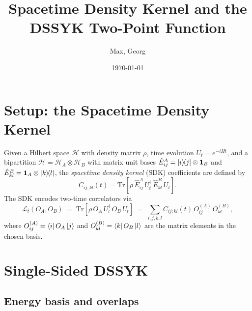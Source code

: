 \documentclass[12pt]{scrarticle}
\title{Spacetime Density Kernel and the DSSYK Two-Point Function}
\author{Max, Georg}
\date{\today}
\begin{document}
\maketitle

\section{Setup: the Spacetime Density Kernel}

Given a Hilbert space $\mathcal{H}$ with density matrix $\rho$, time evolution $U_t = e^{-iHt}$,
and a bipartition $\mathcal{H} = \mathcal{H}_A \otimes \mathcal{H}_B$ with matrix unit bases
$\hat{E}^A_{ij} = \ketbra{i}{j} \otimes \mathbf{1}_B$ and
$\hat{E}^B_{kl} = \mathbf{1}_A \otimes \ketbra{k}{l}$,
the \emph{spacetime density kernel} (SDK) coefficients are defined by
\begin{equation}
    C_{ij;kl}(t) = \text{Tr}\!\left[\rho\,\hat{E}^A_{ij}\,U_t^\dagger\,\hat{E}^B_{kl}\,U_t\right].
    \label{eq:SDK_def}
\end{equation}
The SDK encodes two-time correlators via
\begin{equation}
    \mathcal{L}_t(O_A, O_B)
    \;=\; \text{Tr}\!\left[\rho\,O_A\,U_t^\dagger\,O_B\,U_t\right]
    \;=\; \sum_{i,j,k,l} C_{ij;kl}(t)\,O^{(A)}_{ij}\,O^{(B)}_{kl},
    \label{eq:correlator_from_SDK}
\end{equation}
where $O^{(A)}_{ij} = \bra{i}O_A\ket{j}$ and $O^{(B)}_{kl} = \bra{k}O_B\ket{l}$
are the matrix elements in the chosen basis.

\section{Single-Sided DSSYK}

\subsection{Energy basis and overlaps}
\end{document}
